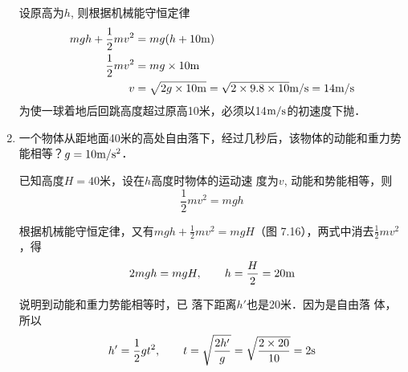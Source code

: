 \begin{enumerate}
\begin{solution}
    设原高为$h$, 则根据机械能守恒定律
   \[\begin{split}
       mgh+\frac{1}{2}mv^2&=mg(h+10{\rm m})\\
\frac{1}{2}mv^2&=mg\times 10{\rm m}\\
v&=\sqrt{2g\times 10{\rm m}}=\sqrt{2\times 9.8\times 10}\text{m}/\text{s}=14\text{m}/\text{s}
   \end{split} \]
    为使一球着地后回跳高度超过原高10米，必须以14$\text{m}/\text{s}$的初速度下抛．
\end{solution}
\item 一个物体从距地面40米的高处自由落下，经过几秒后，该物体的动能和重力势能相等？$g=10\text{m}/\text{s}^2$．

\begin{solution}
    已知高度$H=40$米，设在$h$高度时物体的运动速
    度为$v$, 动能和势能相等，则
    \[\frac{1}{2}mv^2=mgh\]

    根据机械能守恒定律，又有$mgh+\frac{1}{2}mv^2=mgH$（图
7.16），两式中消去$\frac{1}{2}mv^2$，得
\[2mgh=mgH,\qquad h=\frac{H}{2}=20{\rm m}\]

说明到动能和重力势能相等时，已
落下距离$h'$也是20米．因为是自由落
体，所以
\[h'=\frac{1}{2}gt^2,\qquad t=\sqrt{\frac{2h'}{g}}=\sqrt{\frac{2\times 20}{10}}=2{\rm s}\]
\end{solution}
\end{enumerate}

\begin{figure}[htp]
    \centering
{}
    \caption{}
\end{figure}


